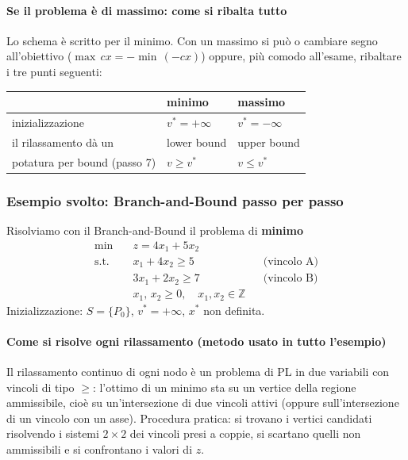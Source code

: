\documentclass[12pt]{extarticle} %
\begin{document}
\paragraph{Se il problema è di massimo: come si ribalta tutto}
Lo schema è scritto per il minimo. Con un massimo si può o cambiare segno all'obiettivo ($\max\,cx = -\min\,(-cx)$) oppure, più comodo all'esame, ribaltare i tre punti seguenti:
\begin{center}
\begin{tabular}{lll}
\hline
 & \textbf{minimo} & \textbf{massimo} \\
\hline
inizializzazione & $v^* = +\infty$ & $v^* = -\infty$ \\
il rilassamento dà un & lower bound & upper bound \\
potatura per bound (passo 7) & $v \ge v^*$ & $v \le v^*$ \\
\hline
\end{tabular}
\end{center}

\subsubsection{Esempio svolto: Branch-and-Bound passo per passo}
Risolviamo con il Branch-and-Bound il problema di \textbf{minimo}
\[
\begin{aligned}
\min \quad & z = 4x_1 + 5x_2 \\
\text{s.t.} \quad & x_1 + 4x_2 \ge 5 &&\text{(vincolo A)}\\
& 3x_1 + 2x_2 \ge 7 &&\text{(vincolo B)}\\
& x_1,\,x_2 \ge 0, \quad x_1,x_2 \in \mathbb{Z}
\end{aligned}
\]
Inizializzazione: $S = \{P_0\}$, $v^* = +\infty$, $x^*$ non definita.

\paragraph{Come si risolve ogni rilassamento (metodo usato in tutto l'esempio)}
Il rilassamento continuo di ogni nodo è un problema di PL in due variabili con vincoli di tipo $\ge$: l'ottimo di un minimo sta su un vertice della regione ammissibile, cioè su un'intersezione di due vincoli attivi (oppure sull'intersezione di un vincolo con un asse). Procedura pratica: si trovano i vertici candidati risolvendo i sistemi $2\times2$ dei vincoli presi a coppie, si scartano quelli non ammissibili e si confrontano i valori di $z$.
\end{document}
